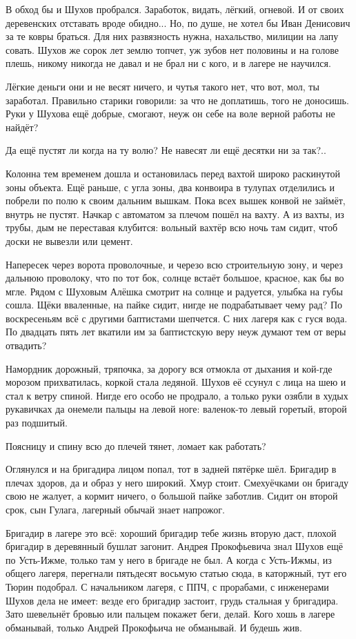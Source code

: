 В обход бы и Шухов пробрался. Заработок, видать, лёгкий, огневой. И от своих деревенских
отставать вроде обидно... Но, по душе, не хотел бы Иван Денисович за те ковры браться. Для них
развязность нужна, нахальство, милиции на лапу совать. Шухов же сорок лет землю топчет, уж
зубов нет половины и на голове плешь, никому никогда не давал и не брал ни с кого, и в лагере
не научился.

Лёгкие деньги \dash они и не весят ничего, и чутья такого нет, что вот, мол, ты заработал.
Правильно старики говорили: за что не доплатишь, того не доносишь. Руки у Шухова ещё добрые,
смогают, неуж он себе на воле верной работы не найдёт?

Да ещё пустят ли когда на ту волю? Не навесят ли ещё десятки ни за так?..

Колонна тем временем дошла и остановилась перед вахтой широко раскинутой зоны объекта. Ещё
раньше, с угла зоны, два конвоира в тулупах отделились и побрели по полю к своим дальним
вышкам. Пока всех вышек конвой не займёт, внутрь не пустят. Начкар с автоматом за плечом
пошёл на вахту. А из вахты, из трубы, дым не переставая клубится: вольный вахтёр всю ночь там
сидит, чтоб доски не вывезли или цемент.

Напересек через ворота проволочные, и черезо всю строительную зону, и через дальнюю
проволоку, что по тот бок, \dash солнце встаёт большое, красное, как бы во мгле. Рядом с Шуховым
Алёшка смотрит на солнце и радуется, улыбка на губы сошла. Щёки вваленные, на пайке сидит,
нигде не подрабатывает \dash чему рад? По воскресеньям всё с другими баптистами шепчется. С них
лагеря как с гуся вода. По двадцать пять лет вкатили им за баптистскую веру \dash неуж думают тем
от веры отвадить?

Намордник дорожный, тряпочка, за дорогу вся отмокла от дыхания и кой-где морозом
прихватилась, коркой стала ледяной. Шухов её ссунул с лица на шею и стал к ветру спиной. Нигде
его особо не продрало, а только руки озябли в худых рукавичках да онемели пальцы на левой
ноге: валенок-то левый горетый, второй раз подшитый.

Поясницу и спину всю до плечей тянет, ломает \dash как работать?

Оглянулся \dash и на бригадира лицом попал, тот в задней пятёрке шёл. Бригадир в плечах здоров,
да и образ у него широкий. Хмур стоит. Смехуёчками он бригаду свою не жалует, а кормит \dash
ничего, о большой пайке заботлив. Сидит он второй срок, сын Гулага, лагерный обычай знает
напрожог.

Бригадир в лагере \dash это всё: хороший бригадир тебе жизнь вторую даст, плохой бригадир в
деревянный бушлат загонит. Андрея Прокофьевича знал Шухов ещё по Усть-Ижме, только там у
него в бригаде не был. А когда с Усть-Ижмы, из общего лагеря, перегнали пятьдесят восьмую
статью сюда, в каторжный, \dash тут его Тюрин подобрал. С начальником лагеря, с ППЧ, с прорабами, с
инженерами Шухов дела не имеет: везде его бригадир застоит, грудь стальная у бригадира. Зато
шевельнёт бровью или пальцем покажет \dash беги, делай. Кого хошь в лагере обманывай, только
Андрей Прокофьича не обманывай. И будешь жив.

